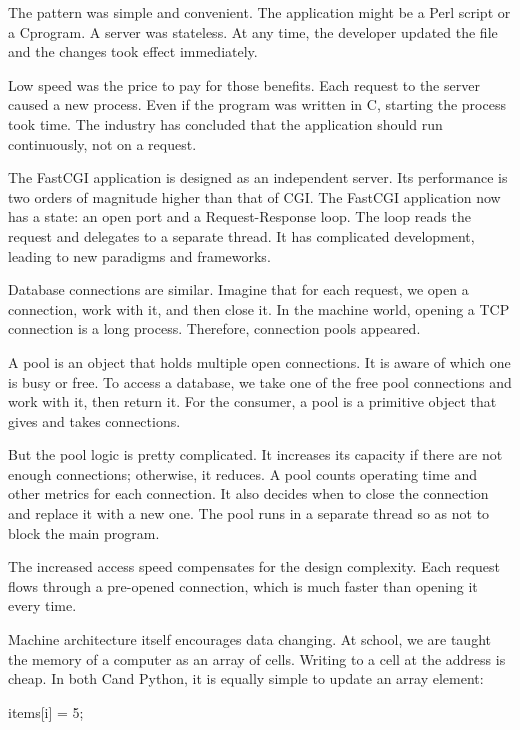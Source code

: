 The pattern was simple and convenient. The application might be a Perl script or a C\Plus\Plus program. A server was stateless. At any time, the developer updated the file and the changes took effect immediately.

Low speed was the price to pay for those benefits. Each request to the server caused a new process.
Even if the program was written in C, starting the process took time.
The industry has concluded that the application should run continuously, not on a request.


The FastCGI application is designed as an independent server. Its performance is two orders of magnitude higher than that of CGI.
The FastCGI application now has a state: an open port and a Request-Response loop.
The loop reads the request and delegates to a separate thread.
It has complicated development, leading to new paradigms and frameworks.

Database connections are similar.
Imagine that for each request, we open a connection, work with it, and then close it.
In the machine world, opening a TCP connection is a long process.
Therefore, connection pools appeared.


A pool is an object that holds multiple open connections.
It is aware of which one is busy or free.
To access a database, we take one of the free pool connections and work with it, then return it.
For the consumer, a pool is a primitive object that gives and takes connections.

But the pool logic is pretty complicated.
It increases its capacity if there are not enough connections; otherwise, it reduces. A pool counts operating time and other metrics for each connection. It also decides when to close the connection and replace it with a new one.
The pool runs in a separate thread so as not to block the main program.

The increased access speed compensates for the design complexity.
Each request flows through a pre-opened connection, which is much faster than opening it every time.

Machine architecture itself encourages data changing. At school, we are taught the memory of a computer as an array of cells.
Writing to a cell at the address is cheap.
In both C\Plus\Plus and Python, it is equally simple to update an array element:

\begin{english}
  \begin{python}
items[i] = 5;
  \end{python}
\end{english}

